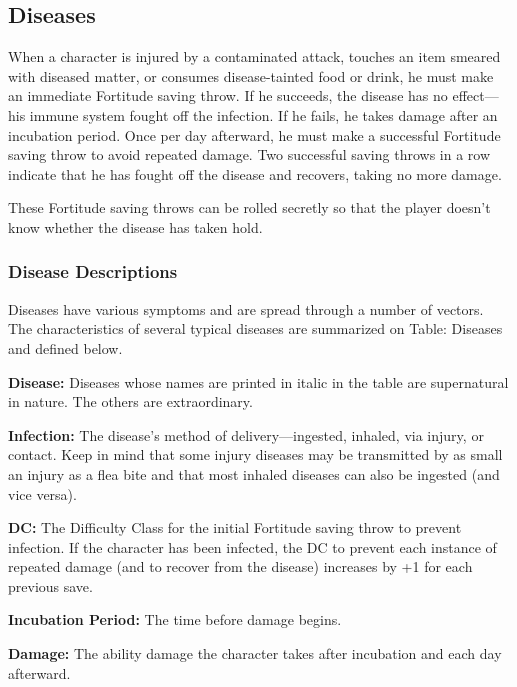 \subsection{Diseases}
When a character is injured by a contaminated attack, touches an item smeared with diseased matter, or consumes disease-tainted food or drink, he must make an immediate Fortitude saving throw. If he succeeds, the disease has no effect---his immune system fought off the infection. If he fails, he takes damage after an incubation period. Once per day afterward, he must make a successful Fortitude saving throw to avoid repeated damage. Two successful saving throws in a row indicate that he has fought off the disease and recovers, taking no more damage.

These Fortitude saving throws can be rolled secretly so that the player doesn't know whether the disease has taken hold.

\subsubsection{Disease Descriptions}
Diseases have various symptoms and are spread through a number of vectors. The characteristics of several typical diseases are summarized on Table: Diseases and defined below.

\textbf{Disease:} Diseases whose names are printed in italic in the table are supernatural in nature. The others are extraordinary.

\textbf{Infection:} The disease's method of delivery---ingested, inhaled, via injury, or contact. Keep in mind that some injury diseases may be transmitted by as small an injury as a flea bite and that most inhaled diseases can also be ingested (and vice versa).

\textbf{DC:} The Difficulty Class for the initial Fortitude saving throw to prevent infection. If the character has been infected, the DC to prevent each instance of repeated damage (and to recover from the disease) increases by +1 for each previous save.

\textbf{Incubation Period:} The time before damage begins.

\textbf{Damage:} The ability damage the character takes after incubation and each day afterward.

